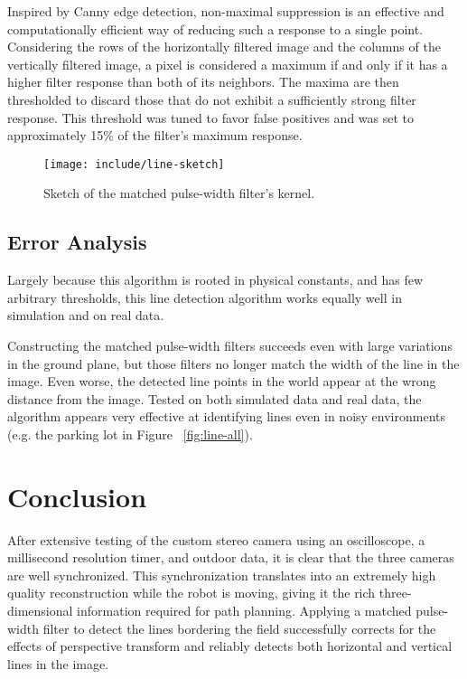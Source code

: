 \documentclass[twocolumn,11pt]{article}
\begin{document}
Inspired by Canny edge detection, non-maximal suppression is an effective and
computationally efficient way of reducing such a response to a single point.
Considering the rows of the horizontally filtered image and the columns of the
vertically filtered image, a pixel is considered a maximum if and only if it
has a higher filter response than both of its neighbors. The maxima are then
thresholded to discard those that do not exhibit a sufficiently strong filter
response. This threshold was tuned to favor false positives and was set to
approximately 15\% of the filter's maximum response.

\begin{figure}
	\centering
	\texttt{[image: include/line-sketch]}
	\caption{Sketch of the matched pulse-width filter's kernel.}
	\label{fig:line-sketch}
\end{figure}

\subsection{Error Analysis}
\label{sec:line-error}

Largely because this algorithm is rooted in physical constants, and has few
arbitrary thresholds, this line detection algorithm works equally well in
simulation and on real data. 

Constructing the matched pulse-width filters succeeds even with large
variations in the ground plane, but those filters no longer match the width of
the line in the image.  Even worse, the detected line points in the world
appear at the wrong distance from the image. Tested on both simulated data and
real data, the algorithm appears very effective at identifying lines even in
noisy environments (e.g.  the parking lot in Figure ~\ref{fig:line-all}).

\section{Conclusion}
\label{sec:conclusion}
After extensive testing of the custom stereo camera using an oscilloscope, a
millisecond resolution timer, and outdoor data, it is clear that the three
cameras are well synchronized. This synchronization translates into an
extremely high quality reconstruction while the robot is moving, giving it the
rich three-dimensional information required for path planning. Applying a
matched pulse-width filter to detect the lines bordering the field successfully
corrects for the effects of perspective transform and reliably detects both
horizontal and vertical lines in the image.
\end{document}
